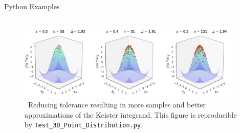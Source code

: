 \documentclass[final]{beamer}
\newlength{\onecolwid}
\newlength{\twocolwid}
\newlength{\threecolwid}
\begin{document}
\begin{frame}[t]
\begin{columns}[t]
\begin{column}{\threecolwid}
\begin{column}{\threecolwid}\vspace{-.8in}
\begin{block}{Python Examples}
    \begin{column}{\onecolwid}
        
    \end{column}
    \begin{column}{\twocolwid}
    \vspace{-2ex}
        \begin{figure}
            \includegraphics[width=0.96\textwidth]{Images/Three_3d_SurfaceScatters.png}
            \caption{\ Reducing tolerance resulting in more samples and better approximations of the Keister integrand. This figure is reproducible by \texttt{Test\_3D\_Point\_Distribution.py}.}
        \end{figure}
    \end{column}
\end{block}
\end{column}
\end{column}


\end{columns}
\end{frame}
\end{document}
